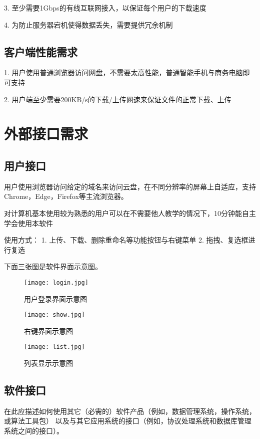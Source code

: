 3. 至少需要1Gbps的有线互联网接入，以保证每个用户的下载速度

4. 为防止服务器宕机使得数据丢失，需要提供冗余机制

\subsection{客户端性能需求}

1. 用户使用普通浏览器访问网盘，不需要太高性能，普通智能手机与商务电脑即可支持

2. 用户端至少需要200KB/s的下载/上传网速来保证文件的正常下载、上传

\section{外部接口需求}
\subsection{用户接口}

用户使用浏览器访问给定的域名来访问云盘，在不同分辨率的屏幕上自适应，支持Chrome，Edge，Firefox等主流浏览器。

对计算机基本使用较为熟悉的用户可以在不需要他人教学的情况下，10分钟能自主学会使用本软件

使用方式：
1. 上传、下载、删除重命名等功能按钮与右键菜单
2. 拖拽、复选框进行复选

下面三张图是软件界面示意图。

\begin{figure}
\centering
\texttt{[image: login.jpg]}
\caption{用户登录界面示意图}\label{fig:noted-figure}
\end{figure}

\begin{figure}
\centering
\texttt{[image: show.jpg]}
\caption{右键界面示意图}\label{fig:noted-figure}
\end{figure}

\begin{figure}
\centering
\texttt{[image: list.jpg]}
\caption{列表显示示意图}\label{fig:noted-figure}
\end{figure}

\subsection{软件接口}

在此应描述如何使用其它（必需的）软件产品（例如，数据管理系统，操作系统，或算法工具包）
以及与其它应用系统的接口（例如，协议处理系统和数据库管理系统之间的接口）。

